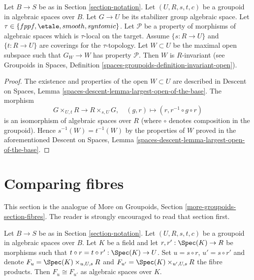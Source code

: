 \begin{lemma}
\label{lemma-property-G-invariant}
Let $B \to S$ be as in Section \ref{section-notation}.
Let $(U, R, s, t, c)$ be a groupoid in algebraic spaces over $B$.
Let $G \to U$ be its stabilizer group algebraic space.
Let
$\tau \in \{fppf, \linebreak[0] \etale, \linebreak[0]
smooth, \linebreak[0] syntomic\}$.
Let $\mathcal{P}$ be a property of morphisms of algebraic spaces
which is $\tau$-local on the target.
Assume $\{s : R \to U\}$ and $\{t : R \to U\}$ are coverings for the
$\tau$-topology. Let $W \subset U$ be the maximal open subspace such that
$G_W \to W$ has property $\mathcal{P}$.
Then $W$ is $R$-invariant (see
Groupoids in Spaces,
Definition \ref{spaces-groupoids-definition-invariant-open}).
\end{lemma}

\begin{proof}
The existence and properties of the open $W \subset U$ are described in
Descent on Spaces, Lemma \ref{spaces-descent-lemma-largest-open-of-the-base}.
The morphism
$$
G \times_{U, t} R \longrightarrow R \times_{s, U} G, \quad
(g, r) \longmapsto (r, r^{-1} \circ g \circ r)
$$
is an isomorphism of algebraic spaces over $R$ (where $\circ$ denotes
composition in the groupoid). Hence $s^{-1}(W) = t^{-1}(W)$ by the
properties of $W$ proved in the aforementioned
Descent on Spaces, Lemma \ref{spaces-descent-lemma-largest-open-of-the-base}.
\end{proof}




\section{Comparing fibres}
\label{section-fibres}

\noindent
This section is the analogue of
More on Groupoids, Section \ref{more-groupoids-section-fibres}.
The reader is strongly encouraged to read that section first.

\begin{lemma}
\label{lemma-two-fibres}
Let $B \to S$ be as in Section \ref{section-notation}.
Let $(U, R, s, t, c)$ be a groupoid in algebraic spaces over $B$.
Let $K$ be a field and let $r, r' : \Spec(K) \to R$
be morphisms such that $t \circ r = t \circ r' : \Spec(K) \to U$.
Set $u = s \circ r$, $u' = s \circ r'$ and denote
$F_u = \Spec(K) \times_{u, U, s} R$ and
$F_{u'} = \Spec(K) \times_{u', U, s} R$ the fibre products.
Then $F_u \cong F_{u'}$ as algebraic spaces over $K$.
\end{lemma}

